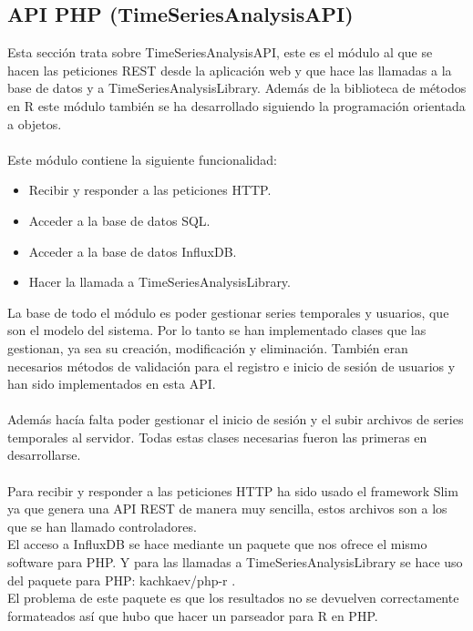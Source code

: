 \documentclass[14pt]{extarticle}
\theoremstyle{definition}
\theoremstyle{remark}
\begin{document}
\subsection{API PHP (TimeSeriesAnalysisAPI)}\label{sec:apiphp}
Esta sección trata sobre TimeSeriesAnalysisAPI, este es el módulo al que se hacen las peticiones REST desde la aplicación web y que hace las llamadas a la base de datos y a TimeSeriesAnalysisLibrary. Además de la biblioteca de métodos en R este módulo también se ha desarrollado siguiendo la programación orientada a objetos.\\\\Este módulo contiene la siguiente funcionalidad:
\begin{itemize}
	\item Recibir y responder a las peticiones HTTP.
	\item Acceder a la base de datos SQL.
	\item Acceder a la base de datos InfluxDB.
	\item Hacer la llamada a TimeSeriesAnalysisLibrary.
\end{itemize} 
La base de todo el módulo es poder gestionar series temporales y usuarios, que son el modelo del sistema. Por lo tanto se han implementado clases que las gestionan, ya sea su creación, modificación y eliminación. También eran necesarios métodos de validación para el registro e inicio de sesión de usuarios y han sido implementados en esta API.\\\\Además hacía falta poder gestionar el inicio de sesión y el subir archivos de series temporales al servidor. Todas estas clases necesarias fueron las primeras en desarrollarse.\\\\Para recibir y responder a las peticiones HTTP ha sido usado el framework Slim ya que genera una API REST de manera muy sencilla, estos archivos son a los que se han llamado controladores.\\El acceso a InfluxDB se hace mediante un paquete que nos ofrece el mismo software para PHP. Y para las llamadas a TimeSeriesAnalysisLibrary se hace uso del paquete para PHP: kachkaev/php-r \cite{web:phpr}.\\El problema de este paquete es que los resultados no se devuelven correctamente formateados así que hubo que hacer un parseador para R en PHP.
\end{document}

